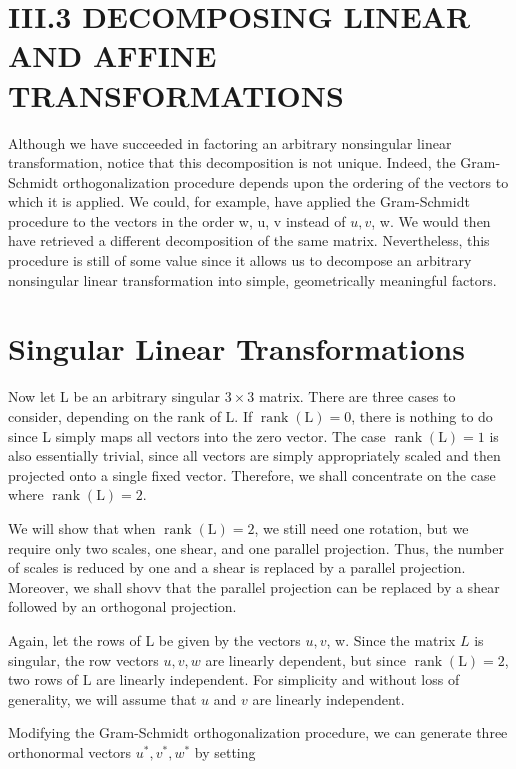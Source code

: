 \section{III.3 DECOMPOSING LINEAR AND AFFINE TRANSFORMATIONS}
Although we have succeeded in factoring an arbitrary nonsingular linear transformation, notice that this decomposition is not unique. Indeed, the Gram-Schmidt orthogonalization procedure depends upon the ordering of the vectors to which it is applied. We could, for example, have applied the Gram-Schmidt procedure to the vectors in the order w, u, v instead of $u, v$, w. We would then have retrieved a different decomposition of the same matrix. Nevertheless, this procedure is still of some value since it allows us to decompose an arbitrary nonsingular linear transformation into simple, geometrically meaningful factors.

\section{Singular Linear Transformations}
Now let L be an arbitrary singular $3 \times 3$ matrix. There are three cases to consider, depending on the rank of L. If $\operatorname{rank}(\mathrm{L})=0$, there is nothing to do since L simply maps all vectors into the zero vector. The case $\operatorname{rank}(\mathrm{L})=1$ is also essentially trivial, since all vectors are simply appropriately scaled and then projected onto a single fixed vector. Therefore, we shall concentrate on the case where $\operatorname{rank}(\mathrm{L})=2$.

We will show that when $\operatorname{rank}(\mathrm{L})=2$, we still need one rotation, but we require only two scales, one shear, and one parallel projection. Thus, the number of scales is reduced by one and a shear is replaced by a parallel projection. Moreover, we shall shovv that the parallel projection can be replaced by a shear followed by an orthogonal projection.

Again, let the rows of L be given by the vectors $u, v$, w. Since the matrix $L$ is singular, the row vectors $u, v, w$ are linearly dependent, but since $\operatorname{rank}(\mathrm{L})=2$, two rows of $\mathrm{L}$ are linearly independent. For simplicity and without loss of generality, we will assume that $u$ and $v$ are linearly independent.

Modifying the Gram-Schmidt orthogonalization procedure, we can generate three orthonormal vectors $u^{*}, v^{*}, w^{*}$ by setting


